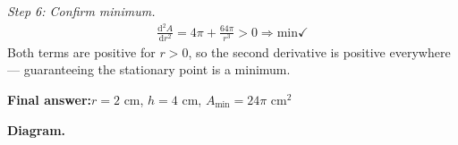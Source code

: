 \documentclass[11pt]{article}
\begin{document}
\textit{Step 6: Confirm minimum.}
\[\begin{gathered}
\frac{\mathrm{d}^2A}{\mathrm{d}r^2} = 4\pi + \frac{64\pi}{r^3} > 0 \Rightarrow \text{min} \checkmark
\end{gathered}\]
Both terms are positive for \( r > 0 \), so the second derivative is positive everywhere --- guaranteeing the stationary point is a minimum.

\begin{answerbox}
\textbf{Final answer:}\quad \(\displaystyle  r = 2 \) cm, \(\displaystyle  h = 4 \) cm, \(\displaystyle  A_{\min} = 24\pi \text{ cm}^2 \)
\end{answerbox}
\textbf{Diagram.}

\begin{center}
\end{center}
\end{document}
